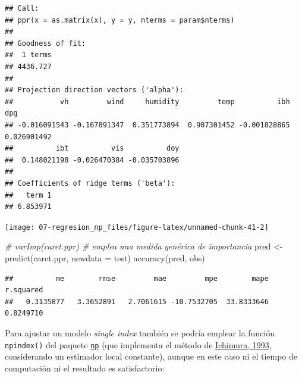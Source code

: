 \documentclass[
  spanish,
]{book}
\newenvironment{Shaded}{\begin{snugshade}}{\end{snugshade}}
\newcommand{\AttributeTok}[1]{\textcolor[rgb]{0.77,0.63,0.00}{#1}}
\newcommand{\CommentTok}[1]{\textcolor[rgb]{0.56,0.35,0.01}{\textit{#1}}}
\newcommand{\FunctionTok}[1]{\textcolor[rgb]{0.00,0.00,0.00}{#1}}
\newcommand{\NormalTok}[1]{#1}
\newcommand{\OtherTok}[1]{\textcolor[rgb]{0.56,0.35,0.01}{#1}}
\newcommand{\SpecialCharTok}[1]{\textcolor[rgb]{0.00,0.00,0.00}{#1}}
\theoremstyle{break}
\theoremstyle{definition}
\theoremstyle{definition}
\theoremstyle{definition}
\theoremstyle{definition}
\theoremstyle{remark}
\begin{document}
\begin{Shaded}
\end{Shaded}

\begin{verbatim}
## Call:
## ppr(x = as.matrix(x), y = y, nterms = param$nterms)
## 
## Goodness of fit:
##  1 terms 
## 4436.727 
## 
## Projection direction vectors ('alpha'):
##           vh         wind     humidity         temp          ibh          dpg 
## -0.016091543 -0.167891347  0.351773894  0.907301452 -0.001828865  0.026901492 
##          ibt          vis          doy 
##  0.148021198 -0.026470384 -0.035703896 
## 
## Coefficients of ridge terms ('beta'):
##   term 1 
## 6.853971
\end{verbatim}

\begin{Shaded}
\end{Shaded}

\begin{center}\texttt{[image: 07-regresion\_np\_files/figure-latex/unnamed-chunk-41-2]} \end{center}

\begin{Shaded}
\begin{Highlighting}[]
\CommentTok{\# varImp(caret.ppr) \# emplea una medida genérica de importancia}
\NormalTok{pred }\OtherTok{\textless{}{-}} \FunctionTok{predict}\NormalTok{(caret.ppr, }\AttributeTok{newdata =}\NormalTok{ test)}
\FunctionTok{accuracy}\NormalTok{(pred, obs)}
\end{Highlighting}
\end{Shaded}

\begin{verbatim}
##          me        rmse         mae         mpe        mape   r.squared 
##   0.3135877   3.3652891   2.7061615 -10.7532705  33.8333646   0.8249710
\end{verbatim}

Para ajustar un modelo \emph{single index} también se podría emplear la función \texttt{npindex()} del paquete \href{https://github.com/JeffreyRacine/R-Package-np}{\texttt{np}} (que implementa el método de \protect\hyperlink{ref-ichimura1993}{Ichimura, 1993}, considerando un estimador local constante), aunque en este caso ni el tiempo de computación ni el resultado es satisfactorio:
\end{document}
